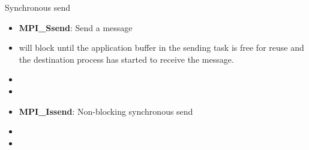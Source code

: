 \documentclass[10pt,t]{beamer}
\begin{document}
\begin{frame}
  \begin{block}{Synchronous send}
    \begin{itemize}
    \item \textbf{MPI\_Ssend}: Send a message 
    \item will block until the application buffer in the sending task is free for reuse and the destination process has started to receive the message.
    \item[] 
    \item[ ]
    \item \textbf{MPI\_Issend}: Non-blocking synchronous send
    \item[] 
    \item[] 
    \end{itemize}
  \end{block}
\end{frame}
\end{document}
